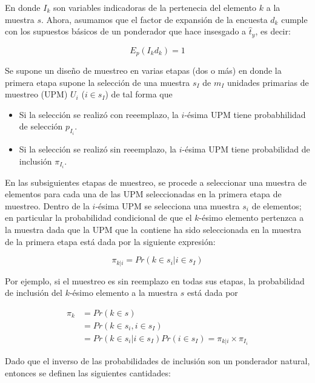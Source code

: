 \documentclass[12pt,spanish,]{book}
\providecommand{\tightlist}{%
  \setlength{\itemsep}{0pt}\setlength{\parskip}{0pt}}
\begin{document}
En donde \(I_k\) son variables indicadoras de la pertenecia del elemento \(k\) a la muestra \(s\). Ahora, asumamos que el factor de expansión de la encuesta \(d_k\) cumple con los supuestos básicos de un ponderador que hace insesgado a \(\hat{t}_{y}\), es decir:

\begin{equation*}
E_p(I_k d_k) = 1
\end{equation*}

Se supone un diseño de muestreo en varias etapas (dos o más) en donde la primera etapa supone la selección de una muestra \(s_I\) de \(m_I\) unidades primarias de muestreo (UPM) \(U_i\) (\(i\in s_I\)) de tal forma que

\begin{itemize}
\tightlist
\item
  Si la selección se realizó con reeemplazo, la \(i\)-ésima UPM tiene probabhilidad de selección \(p_{I_i}\).
\item
  Si la selección se realizó sin reeemplazo, la \(i\)-ésima UPM tiene probabilidad de inclusión \(\pi_{I_i}\).
\end{itemize}

En las subsiguientes etapas de muestreo, se procede a seleccionar una muestra de elementos para cada una de las UPM seleccionadas en la primera etapa de muestreo. Dentro de la \(i\)-ésima UPM se selecciona una muestra \(s_i\) de elementos; en particular la probabilidad condicional de que el \(k\)-ésimo elemento pertenzca a la muestra dada que la UPM que la contiene ha sido seleccionada en la muestra de la primera etapa está dada por la siguiente expresión:

\begin{equation*}
\pi_{k|i} = Pr(k \in s_i | i \in s_I)
\end{equation*}

Por ejemplo, si el muestreo es sin reemplazo en todas sus etapas, la probabilidad de inclusión del \(k\)-ésimo elemento a la muestra \(s\) está dada por

\begin{align*}
\label{piki}
\pi_k & = Pr(k \in s)\\ 
& = Pr(k \in s_i, i \in s_I) \\
& = Pr(k \in s_i | i \in s_I) Pr(i \in s_I) = \pi_{k|i} \times \pi_{I_i}
\end{align*}

Dado que el inverso de las probabilidades de inclusión son un ponderador natural, entonces se definen las siguientes cantidades:
\end{document}
